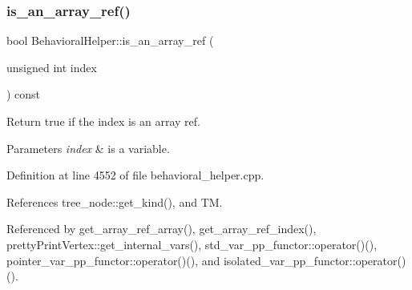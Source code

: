 \subsubsection{\texorpdfstring{is\+\_\+an\+\_\+array\+\_\+ref()}{is\_an\_array\_ref()}}
{\footnotesize\ttfamily bool Behavioral\+Helper\+::is\+\_\+an\+\_\+array\+\_\+ref (\begin{DoxyParamCaption}\item[{unsigned int}]{index }\end{DoxyParamCaption}) const\hspace{0.3cm}{\ttfamily [virtual]}}



Return true if the index is an array ref. 


\begin{DoxyParams}{Parameters}
{\em index} & is a variable. \\
\hline
\end{DoxyParams}


Definition at line 4552 of file behavioral\+\_\+helper.\+cpp.



References tree\+\_\+node\+::get\+\_\+kind(), and TM.



Referenced by get\+\_\+array\+\_\+ref\+\_\+array(), get\+\_\+array\+\_\+ref\+\_\+index(), pretty\+Print\+Vertex\+::get\+\_\+internal\+\_\+vars(), std\+\_\+var\+\_\+pp\+\_\+functor\+::operator()(), pointer\+\_\+var\+\_\+pp\+\_\+functor\+::operator()(), and isolated\+\_\+var\+\_\+pp\+\_\+functor\+::operator()().

